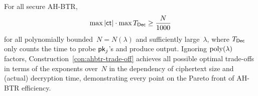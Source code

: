 \begin{corollary}\label{cor:lower-bound}
For all secure AH-BTR,
\begin{align*}
\max{|\ct|}\cdot\max{\TDec}\geq\frac{N}{1000}
\end{align*}
for all polynomially bounded~${N=N(\lambda)}$ and sufficiently large~$\lambda$,
where $\TDec$ only counts the time to probe $\pk_j$'s and produce output.
Ignoring $\operatorname{poly}(\lambda)$ factors,
Construction~\ref{con:ahbtr-trade-off} achieves all possible optimal trade-offs
in terms of the exponents over~$N$ in the dependency of ciphertext size and (actual) decryption time,
demonstrating every point on the Pareto front of AH-BTR efficiency.
\end{corollary}
